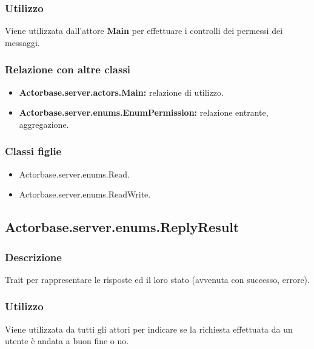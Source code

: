 \documentclass[a4paper]{article}
\begin{document}
			\subsubsection{Utilizzo}
				Viene utilizzata dall'attore \textbf{Main} per effettuare i controlli dei permessi dei messaggi. 				
				
			\subsubsection{Relazione con altre classi}
				\begin{itemize}
					\item \textbf{Actorbase.server.actors.Main:} relazione di utilizzo.
					\item \textbf{Actorbase.server.enums.EnumPermission:} relazione entrante, aggregazione.
				\end{itemize}
				
			\subsubsection{Classi figlie}
				\begin{itemize}
					\item Actorbase.server.enums.Read.
					\item Actorbase.server.enums.ReadWrite.
				\end{itemize}
				
		\subsection{Actorbase.server.enums.ReplyResult}
			\subsubsection{Descrizione}
				Trait per rappresentare le risposte ed il loro stato (avvenuta con successo, errore). 
				
			\subsubsection{Utilizzo}
				Viene utilizzata da tutti gli attori per indicare se la richiesta effettuata da un utente è andata a buon fine o no.
				
\end{document}
